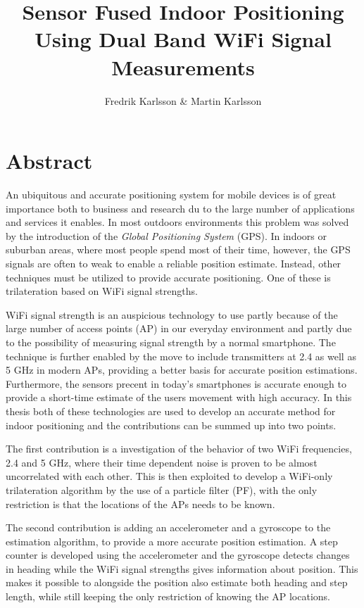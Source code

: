 \documentclass{LTHthesis}
\begin{document}
\begin{titlepages}
\author{Fredrik Karlsson \& Martin Karlsson}
\title{Sensor Fused Indoor Positioning Using Dual Band WiFi Signal Measurements}%
\end{titlepages}
\chapter*{Abstract}
An ubiquitous and accurate positioning system for mobile devices is of great importance both to business and research du to the large number of applications and services it enables. In most outdoors environments this problem was solved by the introduction of the \emph{Global Positioning System} (GPS). In indoors or suburban areas, where most people spend most of their time, however, the GPS signals are often to weak to enable a reliable position estimate. Instead, other techniques must be utilized to provide accurate positioning. One of these is trilateration based on WiFi signal strengths.

WiFi signal strength is an auspicious technology to use partly because of the large number of access points (AP) in our everyday environment and partly due to the possibility of measuring signal strength by a normal smartphone. The technique is further enabled by the move to include transmitters at 2.4  as well as 5 GHz in modern APs, providing a better basis for accurate position estimations. Furthermore, the sensors precent in today's smartphones is accurate enough to provide a short-time estimate of the users movement with high accuracy. In this thesis both of these technologies are used to develop an accurate method for indoor positioning and the contributions can be summed up into two points.

The first contribution is a investigation of the behavior of two WiFi frequencies, 2.4 and 5 GHz, where their time dependent noise is proven to be almost uncorrelated with each other. This is then exploited to develop a WiFi-only trilateration algorithm by the use of a particle filter (PF), with the only restriction is that the locations of the APs needs to be known. 

The second contribution is adding an accelerometer and a gyroscope to the estimation algorithm, to provide a more accurate position estimation. A step counter is developed using the accelerometer and the gyroscope detects changes in heading while the WiFi signal strengths gives information about position. This makes it possible to alongside the position also estimate both heading and step length, while still keeping the only restriction of knowing the AP locations.
    
\end{document}
